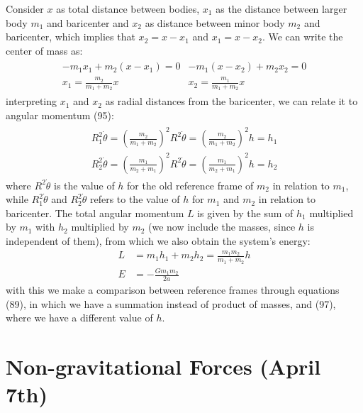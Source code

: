 \documentclass[12pt,a4paper]{article}
\begin{document}
Consider $x$ as total distance between bodies, $x_1$ as the distance between larger body $m_1$ and baricenter and $x_2$ as distance between minor body $m_2$ and baricenter, which implies that $x_2=x-x_1$ and $x_1=x-x_2$. We can write the center of mass as:
\begin{align}
\begin{split}
    -m_1x_1+m_2(x-x_1)=0 \\
    x_1=\frac{m_2}{m_1+m_2}x
\end{split}
\begin{split}
    -m_1(x-x_2)+m_2x_2=0 \\
    x_2=\frac{m_1}{m_1+m_2}x
    \end{split}
\end{align}
interpreting $x_1$ and $x_2$ as radial distances from the baricenter, we can relate it to angular momentum (95):
\begin{align}
\begin{split}
    R_1^2\dot{\theta}=(\frac{m_2}{m_1+m_2})^2R^2\dot{\theta}=(\frac{m_2}{m_1+m_2})^2h=h_1 \\
    R_2^2\dot{\theta}=(\frac{m_1}{m_2+m_1})^2R^2\dot{\theta}=(\frac{m_1}{m_2+m_1})^2h=h_2
\end{split}    
\end{align}
where $R^2\dot{\theta}$ is the value of $h$ for the old reference frame of $m_2$ in relation to $m_1$, while $R_1^2\dot{\theta}$ and $R_2^2\dot{\theta}$ refers to the value of $h$ for $m_1$ and $m_2$ in relation to baricenter. The total angular momentum $L$ is given by the sum of $h_1$ multiplied by $m_1$ with $h_2$ multiplied by $m_2$ (we now include the masses, since $h$ is independent of them), from which we also obtain the system's energy:
\begin{align}
    L&=m_1h_1+m_2h_2=\frac{m_1m_2}{m_1+m_2}h \\
    E&=-\frac{Gm_1m_2}{2a}
\end{align}
with this we make a comparison between reference frames through equations (89), in which we have a summation instead of product of masses, and (97), where we have a different value of $h$.
\vspace{10mm}

\section{Non-gravitational Forces (April 7th)}
\end{document}
